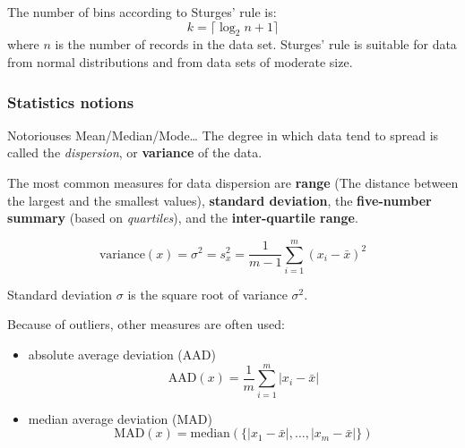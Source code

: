 The number of bins according to Sturges' rule is:
\[
k = \lceil \log_2 n + 1 \rceil
\]
where \( n \) is the number of records in the data set.
Sturges' rule is suitable for data from normal
distributions and from data sets of moderate size.

\subsubsection{Statistics notions}
Notoriouses Mean/Median/Mode\dots
The degree in which data tend to spread is called the
\textit{dispersion}, or \textbf{variance} of the data.

The most common measures for data dispersion are
\textbf{range} (The distance between the largest and the smallest values), \textbf{standard deviation}, the \textbf{five-number summary} (based on \textit{quartiles}), and the \textbf{inter-quartile range}.

\[
\text{variance}(x) = \sigma^2 = s_x^2 = \frac{1}{m-1} \sum_{i=1}^{m} (x_i - \bar{x})^2
\]

Standard deviation $\sigma$ is the square root of variance $\sigma^2$.

Because of outliers, other measures are often used:
\begin{itemize}
	\item absolute average deviation (AAD)
	      \[
		      \text{AAD}(x) = \frac{1}{m} \sum_{i=1}^{m} |x_i - \bar{x}|
	      \]
	\item median average deviation (MAD)
	      \[
		      \text{MAD}(x) = \text{median}\left( \{|x_1 - \bar{x}|, \ldots, |x_m - \bar{x}|\} \right)
	      \]
\end{itemize}

